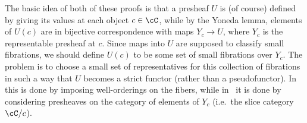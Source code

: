 \documentclass{amsart}
\theoremstyle{remark}
{\newtheorem{{rmk}}[thm]{{Remark}}}
\numberwithin{equation}{section}
\theoremstyle{plain}
\begin{document}
The basic idea of both of these proofs is that a presheaf $U$ is (of course) defined by giving its values at each object $c\in \cC$, while by the Yoneda lemma, elements of $U(c)$ are in bijective correspondence with maps $Y_c \to U$, where $Y_c$ is the representable presheaf at $c$.
Since maps into $U$ are supposed to classify small fibrations, we should define $U(c)$ to be some set of small fibrations over $Y_c$.
The problem is to choose a small set of representatives for this collection of fibrations in such a way that $U$ becomes a strict functor (rather than a pseudofunctor).
In~\cite{klv:ssetmodel} this is done by imposing well-orderings on the fibers, while in~\cite{streicher:ttuniv} it is done by considering presheaves on the category of elements of $Y_c$ (i.e.\ the slice category $\cC/c$).

  
\end{document}

